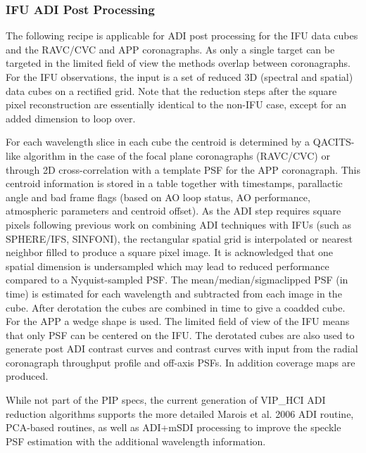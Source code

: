 \subsubsection{IFU ADI Post Processing}
\label{sssec:adi_ifu}


The following recipe is applicable for ADI post processing for the IFU
data cubes and the RAVC/CVC and APP coronagraphs. As only a single
target can be targeted in the limited field of view the methods
overlap between coronagraphs.  For the IFU observations, the input is
a set of reduced 3D (spectral and spatial) data cubes on a rectified
grid. Note that the reduction steps after the square pixel reconstruction
are essentially identical to the non-IFU case, except for an added dimension
to loop over. 

For each wavelength slice in each cube the centroid is determined by a
QACITS-like algorithm in the case of the focal plane coronagraphs
(RAVC/CVC) or through 2D cross-correlation with a template PSF for the
APP coronagraph. This centroid information is stored in a table
together with timestamps, parallactic angle and bad frame flags (based
on AO loop status, AO performance, atmospheric parameters and centroid
offset).  As the ADI step requires square pixels following previous
work on combining ADI techniques with IFUs (such as SPHERE/IFS,
SINFONI), the rectangular spatial grid is interpolated or nearest
neighbor filled to produce a square pixel image.  It is acknowledged
that one spatial dimension is undersampled which may lead to reduced
performance compared to a Nyquist-sampled PSF.  The
mean/median/sigmaclipped PSF (in time) is estimated for each
wavelength and subtracted from each image in the cube.  After
derotation the cubes are combined in time to give a coadded cube. For
the APP a wedge shape is used. The limited field of view of the IFU
means that only PSF can be centered on the IFU. The derotated cubes
are also used to generate post ADI contrast curves and contrast curves
with input from the radial coronagraph throughput profile and off-axis
PSFs. In addition coverage maps are produced.

While not part of the PIP specs, the current generation of VIP\_HCI
ADI reduction algorithms supports the more detailed Marois et al. 2006
ADI routine, PCA-based routines, as well as ADI+mSDI processing to
improve the speckle PSF estimation with the additional wavelength
information.



